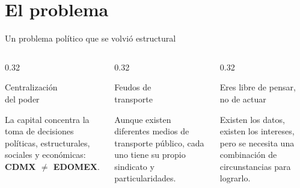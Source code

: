 \section{El problema}


\begin{frame}{Un problema político que se volvió estructural}
  \begin{columns}[T]
    \begin{column}{0.32\textwidth}
      \begin{exampleblock}{\parbox[c][2.2em][c]{\linewidth}{\small Centralización\\del poder}}
        \begin{minipage}[t][2.8cm][t]{\linewidth}\small
          La capital concentra la toma de decisiones políticas,
          estructurales, sociales y económicas: \textbf{CDMX $\neq$ EDOMEX}.
        \end{minipage}
      \end{exampleblock}
    \end{column}
    \begin{column}{0.32\textwidth}
      \begin{block}{\parbox[c][2.2em][c]{\linewidth}{\small Feudos de\\transporte}}
        \begin{minipage}[t][2.8cm][t]{\linewidth}\small
          Aunque existen diferentes medios de transporte público, cada uno tiene su propio sindicato y particularidades.
        \end{minipage}
      \end{block}
    \end{column}
    \begin{column}{0.32\textwidth}
      \begin{alertblock}{\parbox[c][2.2em][c]{\linewidth}{\small Eres libre de pensar,\\no de actuar}}
        \begin{minipage}[t][2.8cm][t]{\linewidth}\small
          Existen los datos, existen los intereses, pero se necesita una combinación de circunstancias para lograrlo.
        \end{minipage}
      \end{alertblock}
    \end{column}
  \end{columns}
\end{frame}

